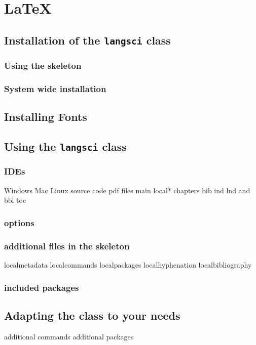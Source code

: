 \chapter{\LaTeX}


\section{Installation of the \texttt{langsci} class}

\subsection{Using the skeleton}
\subsection{System wide installation}
\section{Installing Fonts}



\section{Using the \texttt{langsci} class}
\subsection{IDEs}
Windows
Mac
Linux
source code pdf 
files
main
 local*
 chapters
 bib 
 ind 
 lnd 
 and 
 bbl 
 toc
\subsection{options}
\subsection{additional files in the skeleton}
localmetadata
localcommands
localpackages
localhyphenation
localbibliography

\subsection{included packages}

\section{Adapting the class to your needs}
additional commands
additional packages

